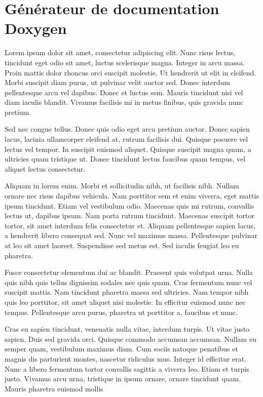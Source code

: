 \documentclass{report}
\begin{document}
        \section{Générateur de documentation Doxygen}
            Lorem ipsum dolor sit amet, consectetur adipiscing elit. Nunc risus lectus, tincidunt eget odio sit amet, luctus scelerisque magna. Integer in arcu massa. Proin mattis dolor rhoncus orci suscipit molestie. Ut hendrerit ut elit in eleifend. Morbi suscipit diam purus, ut pulvinar velit auctor sed. Donec interdum pellentesque arcu vel dapibus. Donec et luctus sem. Mauris tincidunt nisi vel diam iaculis blandit. Vivamus facilisis mi in metus finibus, quis gravida nunc pretium.

            Sed nec congue tellus. Donec quis odio eget arcu pretium auctor. Donec sapien lacus, lacinia ullamcorper eleifend at, rutrum facilisis dui. Quisque posuere vel lectus vel tempor. In suscipit euismod aliquet. Quisque suscipit magna quam, a ultricies quam tristique ut. Donec tincidunt lectus faucibus quam tempus, vel aliquet lectus consectetur.

            Aliquam in lorem enim. Morbi et sollicitudin nibh, ut facilisis nibh. Nullam ornare nec risus dapibus vehicula. Nam porttitor sem et enim viverra, eget mattis ipsum tincidunt. Etiam vel vestibulum odio. Maecenas quis mi rutrum, convallis lectus ut, dapibus ipsum. Nam porta rutrum tincidunt. Maecenas suscipit tortor tortor, sit amet interdum felis consectetur et. Aliquam pellentesque sapien lacus, a hendrerit libero consequat sed. Nunc vel maximus massa. Pellentesque pulvinar at leo sit amet laoreet. Suspendisse sed metus est. Sed iaculis feugiat leo eu pharetra.

            Fusce consectetur elementum dui ac blandit. Praesent quis volutpat urna. Nulla quis nibh quis tellus dignissim sodales nec quis quam. Cras fermentum nunc vel suscipit mattis. Nam tincidunt pharetra massa sed ultricies. Nam tempor nibh quis leo porttitor, sit amet aliquet nisi molestie. In efficitur euismod nunc nec tempus. Pellentesque arcu purus, pharetra ut porttitor a, faucibus et nunc.

            Cras eu sapien tincidunt, venenatis nulla vitae, interdum turpis. Ut vitae justo sapien. Duis sed gravida orci. Quisque commodo accumsan accumsan. Nullam eu semper quam, vestibulum maximus diam. Cum sociis natoque penatibus et magnis dis parturient montes, nascetur ridiculus mus. Integer id efficitur erat. Nunc a libero fermentum tortor convallis sagittis a viverra leo. Etiam et turpis justo. Vivamus arcu urna, tristique in ipsum ornare, ornare tincidunt quam. Mauris pharetra euismod mollis
\end{document}
